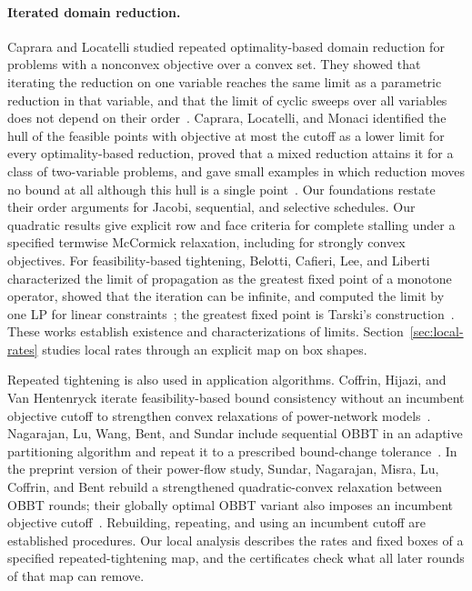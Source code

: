 \paragraph{Iterated domain reduction.} Caprara and Locatelli studied
repeated optimality-based domain reduction for problems with a nonconvex
objective over a convex set. They showed that iterating the reduction on one
variable reaches the same limit as a parametric reduction in that variable,
and that the limit of cyclic sweeps over all variables does not depend on
their order~\cite{caprara2010-global-optimization-problems-and-domain}.
Caprara, Locatelli, and Monaci identified the hull of the feasible points
with objective at most the cutoff as a lower limit for every
optimality-based reduction, proved that a mixed reduction attains it for a
class of two-variable problems, and gave small examples in which reduction
moves no bound at all although this hull is a single
point~\cite{caprara2016-theoretical-and-computational-results-about}. Our
foundations restate their order arguments for Jacobi, sequential, and
selective schedules. Our quadratic results give explicit
row and face criteria for complete stalling under a specified termwise
McCormick relaxation, including for strongly convex objectives. For feasibility-based tightening,
Belotti, Cafieri, Lee, and Liberti characterized the limit of propagation as
the greatest fixed point of a monotone operator, showed that the iteration
can be infinite, and computed the limit by one LP for linear
constraints~\cite{belotti2010-feasibility-based-bounds-tightening-via-fixed-points,belotti2012fbbt}; the greatest fixed point is Tarski's
construction~\cite{tarski1955fixpoint}. These works establish existence and
characterizations of limits. Section~\ref{sec:local-rates} studies local
rates through an explicit map on box shapes.

Repeated tightening is also used in application algorithms. Coffrin,
Hijazi, and Van Hentenryck iterate feasibility-based bound consistency
without an incumbent objective cutoff to strengthen convex relaxations of power-network
models~\cite{coffrin2015-strengthening-convex-relaxations-with-bound}.
Nagarajan, Lu, Wang, Bent, and Sundar include sequential OBBT in an adaptive
partitioning algorithm and repeat it to a prescribed bound-change
tolerance~\cite{nagarajan2019-an-adaptive-multivariate-partitioning-algorithm}.
In the preprint version of their power-flow study, Sundar, Nagarajan, Misra,
Lu, Coffrin, and Bent rebuild a strengthened quadratic-convex relaxation
between OBBT rounds; their globally
optimal OBBT variant also imposes an incumbent objective
cutoff~\cite{sundar2023-optimization-based-bound-tightening-using}.
Rebuilding, repeating, and using an incumbent cutoff are established
procedures. Our local analysis describes the rates and fixed boxes of a
specified repeated-tightening map, and the certificates check what all
later rounds of that map can remove.

